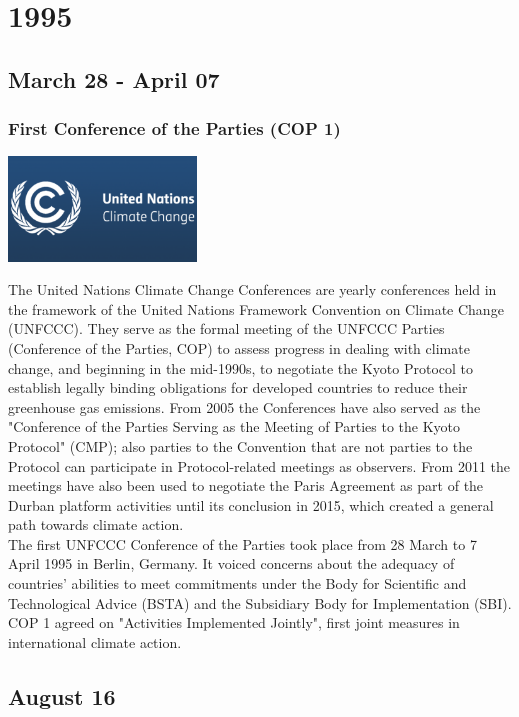 \documentclass[11pt]{report}
\begin{document}
\chapter{1995}
\section{March 28 - April 07}
\subsection{First Conference of the Parties (COP 1)}
\vspace{2mm}\begin{center}\includegraphics[width=5cm]{./img/coplogo.png}\end{center}
The United Nations Climate Change Conferences are yearly conferences held in the framework of the United Nations Framework Convention on Climate Change (UNFCCC). They serve as the formal meeting of the UNFCCC Parties (Conference of the Parties, COP) to assess progress in dealing with climate change, and beginning in the mid-1990s, to negotiate the Kyoto Protocol to establish legally binding obligations for developed countries to reduce their greenhouse gas emissions. From 2005 the Conferences have also served as the "Conference of the Parties Serving as the Meeting of Parties to the Kyoto Protocol" (CMP); also parties to the Convention that are not parties to the Protocol can participate in Protocol-related meetings as observers. From 2011 the meetings have also been used to negotiate the Paris Agreement as part of the Durban platform activities until its conclusion in 2015, which created a general path towards climate action.\\

The first UNFCCC Conference of the Parties took place from 28 March to 7 April 1995 in Berlin, Germany. It voiced concerns about the adequacy of countries' abilities to meet commitments under the Body for Scientific and Technological Advice (BSTA) and the Subsidiary Body for Implementation (SBI). COP 1 agreed on "Activities Implemented Jointly", first joint measures in international climate action.

\section{August 16}
\end{document}
